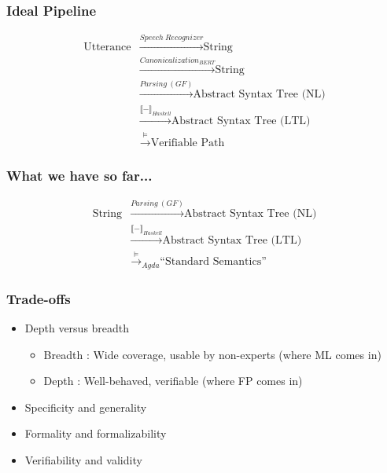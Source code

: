 \documentclass{beamer}
\begin{document}
\begin{frame}
\frametitle{Ideal Pipeline}

\begin{equation} %
\begin{split}
\text{Utterance} & \xrightarrow{\mathit{Speech\ Recognizer}} \text{String}\\
 & \xrightarrow{\mathit{Canonicalization_{BERT}}} \text{String}\\
 & \xrightarrow{\mathit{Parsing\ (GF)}} \text{Abstract Syntax Tree (NL)}\\
 & \xrightarrow{\llbracket - \rrbracket_{Haskell}} \text{Abstract Syntax Tree (LTL)}\\
 & \xrightarrow{\vDash} \text{Verifiable Path}
\end{split}
\end{equation} 
\end{frame}

\begin{frame}
\frametitle{What we have so far...}

\begin{equation} %
\begin{split}
\text{String} & \xrightarrow{\mathit{Parsing\ (GF)}} \text{Abstract Syntax Tree (NL)}\\
 & \xrightarrow{\llbracket - \rrbracket_{Haskell}} \text{Abstract Syntax Tree (LTL)}\\
 & \xrightarrow{\vDash}_{Agda} \text{``Standard Semantics''}
\end{split}
\end{equation} 
\end{frame}

\begin{frame}
\frametitle{Trade-offs}
\begin{itemize}[<+->]
\item Depth versus breadth
\begin{itemize}[<+->]
\item Breadth : Wide coverage, usable by non-experts (where ML comes in)
\item Depth   : Well-behaved, verifiable (where FP comes in)
\end{itemize}
\item Specificity and generality
\item Formality and formalizability
\item Verifiability and validity
\end{itemize}
\end{frame}
\end{document}
